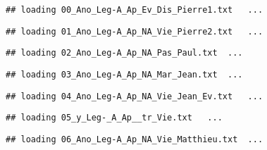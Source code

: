 \documentclass[]{article}
\newenvironment{Shaded}{\begin{snugshade}}{\end{snugshade}}
\newcommand{\CommentTok}[1]{\textcolor[rgb]{0.56,0.35,0.01}{\textit{#1}}}
\newcommand{\DataTypeTok}[1]{\textcolor[rgb]{0.13,0.29,0.53}{#1}}
\newcommand{\DecValTok}[1]{\textcolor[rgb]{0.00,0.00,0.81}{#1}}
\newcommand{\KeywordTok}[1]{\textcolor[rgb]{0.13,0.29,0.53}{\textbf{#1}}}
\newcommand{\NormalTok}[1]{#1}
\newcommand{\OperatorTok}[1]{\textcolor[rgb]{0.81,0.36,0.00}{\textbf{#1}}}
\newcommand{\OtherTok}[1]{\textcolor[rgb]{0.56,0.35,0.01}{#1}}
\newcommand{\StringTok}[1]{\textcolor[rgb]{0.31,0.60,0.02}{#1}}
\begin{document}
\begin{Shaded}
\end{Shaded}

\begin{verbatim}
## loading 00_Ano_Leg-A_Ap_Ev_Dis_Pierre1.txt   ...
\end{verbatim}

\begin{verbatim}
## loading 01_Ano_Leg-A_Ap_NA_Vie_Pierre2.txt   ...
\end{verbatim}

\begin{verbatim}
## loading 02_Ano_Leg-A_Ap_NA_Pas_Paul.txt  ...
\end{verbatim}

\begin{verbatim}
## loading 03_Ano_Leg-A_Ap_NA_Mar_Jean.txt  ...
\end{verbatim}

\begin{verbatim}
## loading 04_Ano_Leg-A_Ap_NA_Vie_Jean_Ev.txt   ...
\end{verbatim}

\begin{verbatim}
## loading 05_y_Leg-_A_Ap__tr_Vie.txt   ...
\end{verbatim}

\begin{verbatim}
## loading 06_Ano_Leg-A_Ap_NA_Vie_Matthieu.txt  ...
\end{verbatim}
\end{document}
